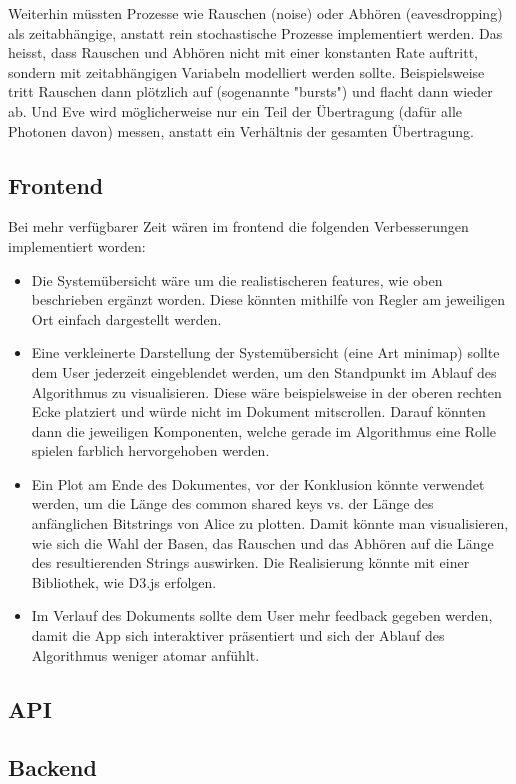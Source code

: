 \documentclass[a4paper,10.2pt,pdftex]{scrartcl}%
\begin{document}
Weiterhin müssten Prozesse wie Rauschen (noise) oder Abhören (eavesdropping) als zeitabhängige, anstatt rein stochastische Prozesse implementiert werden. Das heisst, dass Rauschen und Abhören nicht mit einer konstanten Rate auftritt, sondern mit zeitabhängigen Variabeln modelliert werden sollte. Beispielsweise tritt Rauschen dann plötzlich auf (sogenannte "bursts") und flacht dann wieder ab. Und Eve wird möglicherweise nur ein Teil der Übertragung (dafür alle Photonen davon) messen, anstatt ein Verhältnis der gesamten Übertragung.

\subsection{Frontend}

Bei mehr verfügbarer Zeit wären im frontend die folgenden Verbesserungen implementiert worden:
\begin{itemize}
\item Die Systemübersicht wäre um die realistischeren features, wie oben beschrieben ergänzt worden. Diese könnten mithilfe von Regler am jeweiligen Ort einfach dargestellt werden.
\item Eine verkleinerte Darstellung der Systemübersicht (eine Art minimap) sollte dem User jederzeit eingeblendet werden, um den Standpunkt im Ablauf des Algorithmus zu visualisieren. Diese wäre beispielsweise in der oberen rechten Ecke platziert und würde nicht im Dokument mitscrollen. Darauf könnten dann die jeweiligen Komponenten, welche gerade im Algorithmus eine Rolle spielen farblich hervorgehoben werden.
\item Ein Plot am Ende des Dokumentes, vor der Konklusion könnte verwendet werden, um die Länge des common shared keys vs. der Länge des anfänglichen Bitstrings von Alice zu plotten. Damit könnte man visualisieren, wie sich die Wahl der Basen, das Rauschen und das Abhören auf die Länge des resultierenden Strings auswirken. Die Realisierung könnte mit einer Bibliothek, wie D3.js erfolgen.
\item Im Verlauf des Dokuments sollte dem User mehr feedback gegeben werden, damit die App sich interaktiver präsentiert und sich der Ablauf des Algorithmus weniger atomar anfühlt.
\end{itemize}
\subsection{API}
\subsection{Backend}


\newpage
\nocite{*}	

 


\appendix




\end{document}
